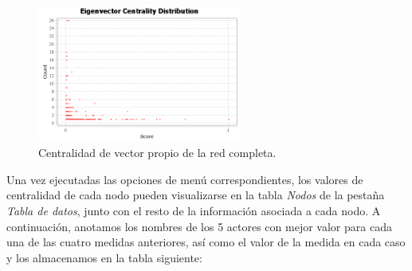 \documentclass{uimppracticas}
\begin{document}
\begin{figure}[H]
	\centering
	\includegraphics[width=0.6\textwidth]{images/Eigenvector-Centralities}
	\caption{Centralidad de vector propio de la red completa.}
	\label{Eigenvector-Centralities}
\end{figure}

Una vez ejecutadas las opciones de menú correspondientes, los valores de centralidad de cada nodo pueden visualizarse en la tabla \textit{Nodos} de la pestaña \textit{Tabla de datos}, junto con el resto de la información asociada a cada nodo. A continuación, anotamos los nombres de los 5 actores con mejor valor para cada una de las cuatro medidas anteriores, así como el valor de la medida en cada caso y los almacenamos en la tabla siguiente:
\end{document}
